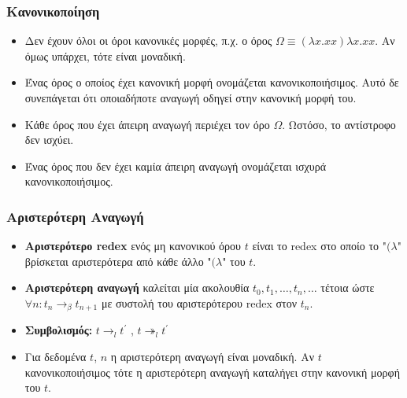 \documentclass{beamer}
\begin{document}
\begin{frame}
\frametitle{Κανονικοποίηση}
\begin{itemize}
\item Δεν έχουν όλοι οι όροι κανονικές μορφές, π.χ. ο όρος $\Omega \equiv  (\lambda x . xx) \lambda x . xx$. Αν όμως υπάρχει, τότε είναι μοναδική. \pause
\item Ένας όρος ο οποίος έχει κανονική μορφή ονομάζεται κανονικοποιήσιμος. Αυτό δε συνεπάγεται ότι οποιαδήποτε αναγωγή οδηγεί στην κανονική μορφή του. \pause
\item Κάθε όρος που έχει άπειρη αναγωγή περιέχει τον όρο $\Omega$. Ωστόσο, το αντίστροφο δεν ισχύει.\pause
\item Ένας όρος που δεν έχει καμία άπειρη αναγωγή ονομάζεται ισχυρά κανονικοποιήσιμος. 
\end{itemize}
\end{frame}

\begin{frame}
\frametitle{Αριστερότερη Αναγωγή}
\begin{itemize}
\item \textbf{Αριστερότερο redex} ενός μη κανονικού όρου $t$ είναι το redex στο οποίο το "$(\lambda$" βρίσκεται αριστερότερα από κάθε άλλο "$(\lambda$" του $t$. \pause
\item \textbf{Αριστερότερη αναγωγή} καλείται μία ακολουθία $t_0, t_1, \ldots, t_n, \ldots$ τέτοια ώστε $\forall n: t_n \rightarrow _\beta t_{n+1}$ με συστολή του αριστερότερου redex στον $t_n$. \pause
\item \textbf{Συμβολισμός:} $t \rightarrow _l t^\prime$ , $t \twoheadrightarrow _l t^\prime$ \pause
\item Για δεδομένα $t$, $n$ η αριστερότερη αναγωγή είναι μοναδική. Αν $t$ κανονικοποιήσιμος τότε η αριστερότερη αναγωγή καταλήγει στην κανονική μορφή του $t$. \pause
\end{itemize}
\end{frame}
\end{document}
